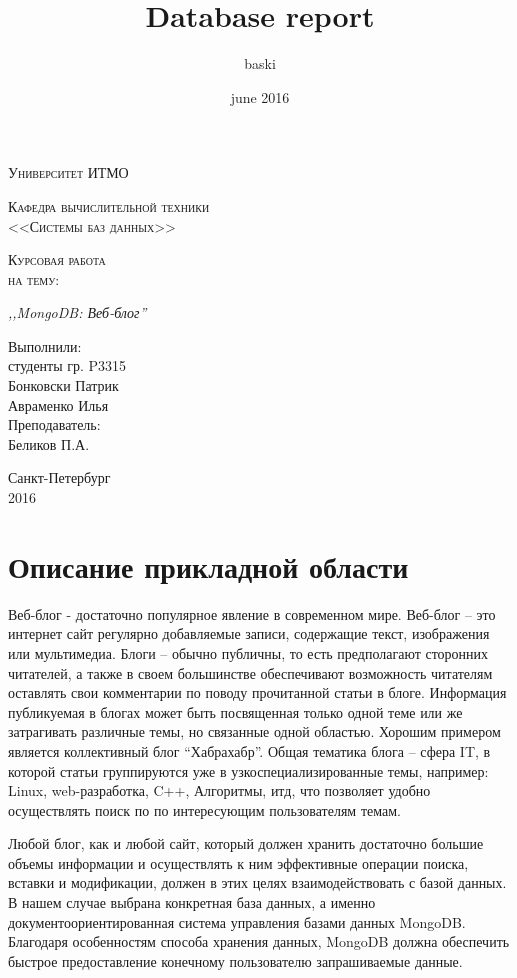 \documentclass[a4paper]{article}
\title{Database report}
\author{baski}
\date{june 2016}
\begin{document}
\begin{titlepage}
	\centering
	{\scshape\LARGE Университет ИТМО\par}
	\vspace{0.3cm}
	{\scshape\Large Кафедра вычислительной техники\\
	\vspace{0.2cm}
	<<Системы баз данных>>\par}
	\vspace{4cm}
	{\scshape\large Курсовая работа\\
	\vspace{0.2cm}
	на тему:\par}
	\vspace{0.2cm}
	{\itshape\large,,MongoDB: Веб-блог''\/}
	\vfill
	{\large
	{\raggedright{}
		\hspace{8.5cm}Выполнили: \\
		\hspace{8.5cm}студенты гр. P3315\\
		\hspace{8.5cm}Бонковски Патрик\\
		\hspace{8.5cm}Авраменко Илья\\
		\hspace{8.5cm}Преподаватель: \\
		\hspace{8.5cm}Беликов П.А.\\
	\par}
	\vfill
	Санкт-Петербург\\
	2016\\}
\end{titlepage}
\section{Описание прикладной области} Веб-блог - достаточно популярное явление в современном мире. Веб-блог -- это интернет сайт регулярно добавляемые записи, содержащие текст, изображения или мультимедиа. Блоги -- обычно публичны, то есть предполагают сторонних читателей, а также в своем большинстве обеспечивают возможность читателям оставлять свои комментарии по поводу прочитанной статьи в блоге. Информация публикуемая в блогах может быть посвященная только одной теме или же затрагивать
различные темы, но связанные одной областью. Хорошим примером является коллективный блог ``Хабрахабр''. Общая тематика блога -- сфера IT, в которой статьи группируются уже в узкоспециализированные темы, например: Linux, web-разработка, C++, Алгоритмы, итд, что позволяет удобно осуществлять поиск по по интересующим пользователям темам. \par
Любой блог, как и любой сайт, который должен хранить достаточно большие объемы информации и осуществлять к ним эффективные операции поиска, вставки и модификации, должен в этих целях взаимодействовать с базой данных. В нашем случае выбрана конкретная база данных, а именно документоориентированная система управления базами данных MongoDB. Благодаря особенностям способа хранения данных, MongoDB должна обеспечить быстрое предоставление конечному пользователю запрашиваемые данные.
\end{document}
